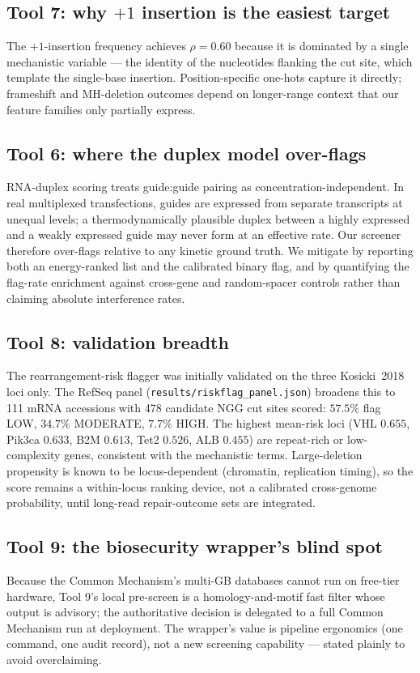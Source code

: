 \subsection{Tool 7: why $+1$ insertion is the easiest target}
The $+1$-insertion frequency achieves $\rho = 0.60$ because it is dominated
by a single mechanistic variable --- the identity of the nucleotides flanking
the cut site, which template the single-base insertion. Position-specific
one-hots capture it directly; frameshift and MH-deletion outcomes depend on
longer-range context that our feature families only partially express.

\subsection{Tool 6: where the duplex model over-flags}
RNA-duplex scoring treats guide:guide pairing as concentration-independent.
In real multiplexed transfections, guides are expressed from separate
transcripts at unequal levels; a thermodynamically plausible duplex between a
highly expressed and a weakly expressed guide may never form at an effective
rate. Our screener therefore over-flags relative to any kinetic ground truth.
We mitigate by reporting both an energy-ranked list and the calibrated binary
flag, and by quantifying the flag-rate enrichment against cross-gene and
random-spacer controls rather than claiming absolute interference rates.

\subsection{Tool 8: validation breadth}
The rearrangement-risk flagger was initially validated on the three
Kosicki~2018 loci only. The RefSeq panel
(\texttt{results/riskflag\_panel.json}) broadens this to 111 mRNA
accessions with 478 candidate NGG cut sites scored:
$57.5\%$ flag LOW, $34.7\%$ MODERATE, $7.7\%$ HIGH. The highest
mean-risk loci (VHL $0.655$, Pik3ca $0.633$, B2M $0.613$, Tet2 $0.526$,
ALB $0.455$) are repeat-rich or low-complexity genes, consistent with the
mechanistic terms. Large-deletion propensity is known to be
locus-dependent (chromatin, replication timing), so the score remains a
within-locus ranking device, not a calibrated cross-genome probability,
until long-read repair-outcome sets are integrated.

\subsection{Tool 9: the biosecurity wrapper's blind spot}
Because the Common Mechanism's multi-GB databases cannot run on free-tier
hardware, Tool 9's local pre-screen is a homology-and-motif fast filter whose
output is advisory; the authoritative decision is delegated to a full Common
Mechanism run at deployment. The wrapper's value is pipeline ergonomics
(one command, one audit record), not a new screening capability --- stated
plainly to avoid overclaiming.
